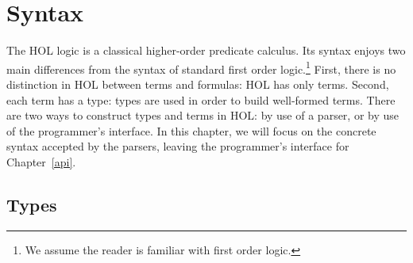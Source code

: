 \chapter{Syntax}
{
 \newcommand{\term}       {\mbox{\it term}}
 \newcommand{\bs}         {\mbox{$\backslash$}}
 \newcommand{\IMP}       {\mbox{\tt ==>}}
 \newcommand{\ALL}       {\mbox{\tt !}}
 \newcommand{\EXISTS}       {\mbox{\tt ?}}
 \newcommand{\CHOOSE}       {\mbox{\tt @}}
 \newcommand{\EXISTSONE}       {\mbox{\tt ?!}}
 \newcommand{\LET}       {\mbox{\tt let}}
 \newcommand{\und}       {\mbox{\tt and}}
 \newcommand{\IN}       {\mbox{\tt in}}
 \newcommand{\CONS}       {\mbox{\tt CONS}}
 \newcommand{\INSERT}    {\mbox{\tt INSERT}}
 \newcommand{\SUC}       {\mbox{\tt SUC}}
 \newcommand{\vstr}       {\mbox{\it vstr}}
 \newcommand{\numeral}    {\mbox{\it numeral}}
 \newcommand{\charseq}    {\mbox{\it charseq}}

The HOL logic is a classical higher-order predicate calculus. Its
syntax enjoys two main differences from the syntax of standard first
order logic.\footnote{We assume the reader is familiar with first
  order logic.}  First, there is no distinction in HOL between terms
and formulas: HOL has only terms. Second, each term has a type: types
are used in order to build well-formed terms. There are two ways to
construct types and terms in HOL: by use of a parser, or by use of the
programmer's interface. In this chapter, we will focus on the concrete
syntax accepted by the parsers, leaving the programmer's interface for
Chapter~\ref{api}.


\section{Types}

}

